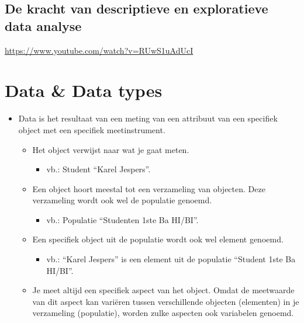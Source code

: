\documentclass[]{tufte-book}
\providecommand{\tightlist}{%
  \setlength{\itemsep}{0pt}\setlength{\parskip}{0pt}}
\begin{document}
\hypertarget{de-kracht-van-descriptieve-en-exploratieve-data-analyse}{%
\subsection{De kracht van descriptieve en exploratieve data analyse}\label{de-kracht-van-descriptieve-en-exploratieve-data-analyse}}

\url{https://www.youtube.com/watch?v=RUwS1uAdUcI}

\hypertarget{data-data-types}{%
\section{Data \& Data types}\label{data-data-types}}

\begin{itemize}
\tightlist
\item
  Data is het resultaat van een meting van een attribuut van een specifiek object met een specifiek meetinstrument.

  \begin{itemize}
  \tightlist
  \item
    Het object verwijst naar wat je gaat meten.

    \begin{itemize}
    \tightlist
    \item
      vb.: Student ``Karel Jespers''.
    \end{itemize}
  \item
    Een object hoort meestal tot een verzameling van objecten. Deze verzameling wordt ook wel de populatie genoemd.

    \begin{itemize}
    \tightlist
    \item
      vb.: Populatie ``Studenten 1ste Ba HI/BI''.
    \end{itemize}
  \item
    Een specifiek object uit de populatie wordt ook wel element genoemd.

    \begin{itemize}
    \tightlist
    \item
      vb.: ``Karel Jespers'' is een element uit de populatie ``Student 1ste Ba HI/BI''.
    \end{itemize}
  \item
    Je meet altijd een specifiek aspect van het object. Omdat de meetwaarde van dit aspect kan variëren tussen verschillende objecten (elementen) in je verzameling (populatie), worden zulke aspecten ook variabelen genoemd.


\end{itemize}
\end{itemize}
\end{document}
